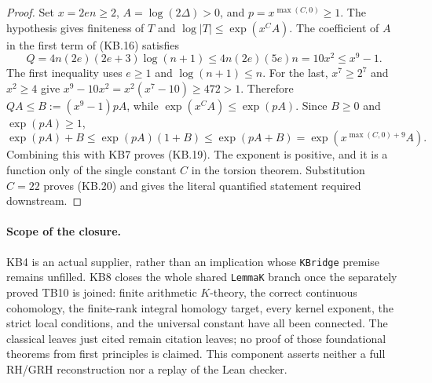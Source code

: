 \begin{proof}
Set $x=2en\ge2$, $A=\log(2\Delta)>0$, and
$p=x^{\max(C,0)}\ge1$.  The hypothesis gives finiteness of $T$
and $\log|T|\le\exp(x^C A)$.  The coefficient of $A$ in the
first term of (KB.16) satisfies
\[
 Q=4n(2e)(2e+3)\log(n+1)
 \le 4n(2e)(5e)n=10x^2\le x^9-1.
 \tag{KB.21}
\]
The first inequality uses $e\ge1$ and $\log(n+1)\le n$.
For the last, $x^7\ge2^7$ and $x^2\ge4$ give
$x^9-10x^2=x^2(x^7-10)\ge472>1$.
Therefore $QA\le B:=(x^9-1)pA$, while
$\exp(x^CA)\le\exp(pA)$.  Since $B\ge0$ and $\exp(pA)\ge1$,
\[
 \exp(pA)+B\le\exp(pA)(1+B)
                \le\exp(pA+B)
                =\exp\!\left(x^{\max(C,0)+9}A\right).
\]
Combining this with KB7 proves (KB.19).  The exponent is positive,
and it is a function only of the single constant $C$ in the
torsion theorem.  Substitution $C=22$ proves (KB.20) and gives the
literal quantified statement required downstream.
\end{proof}

\paragraph{Scope of the closure.}
KB4 is an actual supplier, rather than an implication whose
\texttt{KBridge} premise remains unfilled.  KB8 closes the whole
shared \texttt{LemmaK} branch once the separately proved TB10 is
joined: finite arithmetic $K$-theory, the correct continuous
cohomology, the finite-rank integral homology target, every kernel
exponent, the strict local conditions, and the universal constant
have all been connected.  The classical leaves just cited remain
citation leaves; no proof of those foundational theorems from
first principles is claimed.  This component asserts neither a
full RH/GRH reconstruction nor a replay of the Lean checker.
